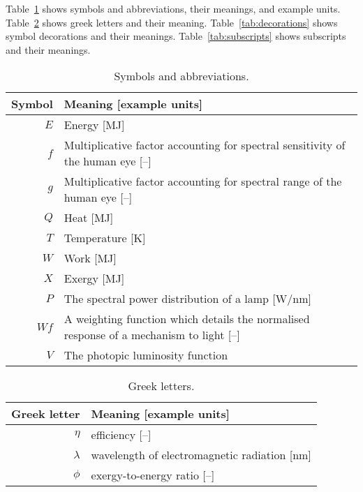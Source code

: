 
\noindent 
Table~\ref{tab:symbols} shows symbols and abbreviations, their meanings, and example units.
Table~\ref{tab:greek} shows greek letters and their meaning.
Table~\ref{tab:decorations} shows symbol decorations and their meanings.
Table~\ref{tab:subscripts} shows subscripts and their meanings.


  
\begin{table}
\centering %
\caption{Symbols and abbreviations.}
\begin{tabular}{r l}
\toprule
Symbol & Meaning [example units] \\
\midrule
$E$ & Energy [MJ] \\
$f$ & Multiplicative factor accounting for spectral sensitivity of the human eye [--] \\
$g$ & Multiplicative factor accounting for spectral range of the human eye [--] \\
$Q$ & Heat [MJ] \\
$T$ & Temperature [K] \\
$W$ & Work [MJ] \\
$X$ & Exergy [MJ] \\
$P$ & The spectral power distribution of a lamp [W/nm] \\
$Wf$ & A weighting function which details the normalised response of a mechanism to light [--] \\
$V$ & The photopic luminosity function \\
\bottomrule
\end{tabular}
\label{tab:symbols}
\end{table}



\begin{table}
\centering %
\caption{Greek letters.}
\begin{tabular}{r l}
  \toprule
  Greek letter & Meaning [example units] \\
  \midrule
  $\eta$ & efficiency [--] \\
  $\lambda$ & wavelength of electromagnetic radiation [nm] \\
  $\phi$ & exergy-to-energy ratio [--] \\
  \bottomrule
\end{tabular}
\label{tab:greek}
\end{table}


